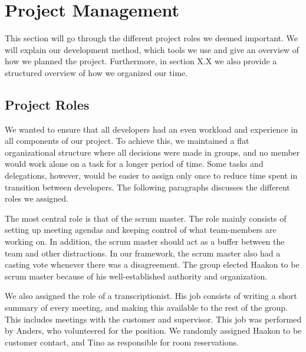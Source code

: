 \section{Project Management}
This section will go through the different project roles we deemed
important. We will explain our development method, which tools we use
and give an overview of how we planned the project. Furthermore, in
section X.X we also provide a structured overview of how we organized
our time. 

\subsection{Project Roles}
We wanted to ensure that all developers had an even workload and
experience in all components of our project. To achieve this, we
maintained a flat organizational structure where all decisions were
made in groups, and no member would work alone on a task for a longer
period of time. Some tasks and delegations, however, would be easier to
assign only once to reduce time spent in transition between developers.
The following paragraphs discusses the different roles we assigned.

The most central role is that of the scrum master. The role mainly
consists of setting up meeting agendas and keeping control of what
team-members are working on. In addition, the scrum master should act
as a buffer between the team and other distractions. In our framework,
the scrum master also had a casting vote whenever there was a
disagreement. The group elected Haakon to be scrum master because of
his well-established authority and organization.

We also assigned the role of a transcriptionist. His job consists of
writing a short summary of every meeting, and making this available to
the rest of the group. This includes meetings with the customer and
supervisor. This job was performed by Anders, who volunteered for the
position. We randomly assigned Haakon to be customer contact, and
Tino as responsible for room reservations.

